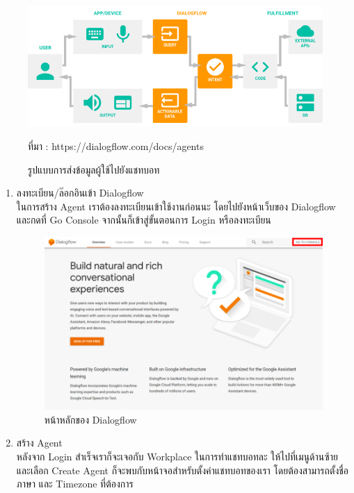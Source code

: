  \begin{figure}[H]
	\centering
	\includegraphics[width=0.9\columnwidth]{Figures/2/chatbot}
	\caption{รูปแบบการส่งข้อมูลผู้ใช้ไปยังแชทบอท}{ที่มา : https://dialogflow.com/docs/agents}
	\label{Fig:dialogflow}
\end{figure}
\begin{enumerate}
\item ลงทะเบียน/ล๊อกอินเข้า Dialogflow \\
ในการสร้าง Agent เราต้องลงทะเบียนเข้าใช้งานก่อนนะ โดยไปยังหน้าเว็บของ Dialogflow และกดที่ Go Console จากนั้นก็เข้าสู่ขั้นตอนการ Login หรือลงทะเบียน

	\begin{figure}[H]
		\centering
		\includegraphics[width=0.9\columnwidth]{Figures/2/dialogflow_1}
		\caption{หน้าหลักของ Dialogflow}
		\label{Fig:dialogflow1}
	\end{figure}

\item สร้าง Agent \\
หลังจาก Login สำเร็จเราก็จะเจอกับ Workplace ในการทำแชทบอทละ ให้ไปที่เมนูด้านซ้าย และเลือก Create Agent ก็จะพบกับหน้าจอสำหรับตั้งค่าแชทบอทของเรา โดยต้องสามารถตั้งชื่อ ภาษา และ Timezone ที่ต้องการ


\end{enumerate}
